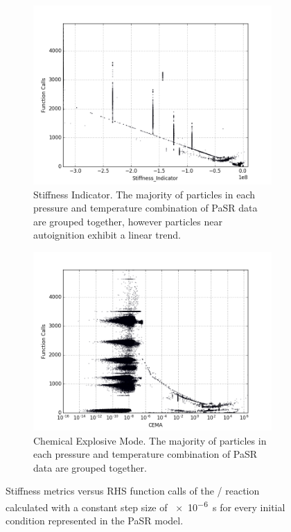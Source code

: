 \documentclass[12pt]{ussci}
\begin{document}
\begin{figure}[htbp]
\begin{subfigure}{0.43\textwidth}
        \label{fig:SI1H2COPaSR}
    \end{subfigure}
    \begin{subfigure}{0.43\textwidth}
        \includegraphics[width=\linewidth]{PaSR_Fn_Work_Stiffness_Indicator_1e-06_08_05.png}
        \caption{Stiffness Indicator. The majority of particles in each pressure and temperature combination of PaSR data are grouped together, however particles near autoignition exhibit a linear trend.}
        \label{fig:SI2H2COPaSR}
    \end{subfigure}
    \hfill
        \begin{subfigure}{0.43\textwidth}
        \includegraphics[width=\linewidth]{PaSR_Fn_Work_CEMA_1e-06_08_04.png}
        \caption{Chemical Explosive Mode. The majority of particles in each pressure and temperature combination of PaSR data are grouped together.}
        \label{fig:CEMH2COPaSR}
    \end{subfigure}
    \caption{Stiffness metrics versus RHS function calls of the \slash {} reaction calculated with a constant step size of \SI{e-6}{\second} for every initial condition represented in the PaSR model.}
    \label{fig:H2COPaSRStiffness}
\end{figure}
\end{document}
